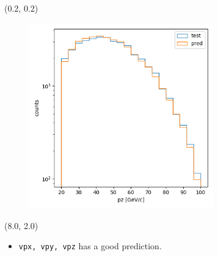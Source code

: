 \documentclass[12pt, xcolor={dvipsnames}, aspectratio = 169]{beamer}
\begin{document}
\begin{frame}[fragile]

\begin{textblock}{8.0}(0.2, 0.2)
    \begin{figure}
        \centering
        \includegraphics[width=8.0cm]{../imgs/cls-vpz.png}
    \end{figure}
\end{textblock}

\begin{textblock}{8.0}(8.0, 2.0)
    \begin{itemize}
        \item \verb|vpx, vpy, vpz| has a good prediction.
    \end{itemize}
\end{textblock}

\end{frame}
\end{document}
